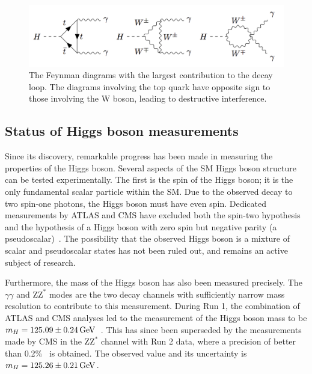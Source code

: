\begin{figure}[hptb]
  \centering
  \includegraphics[width=\textwidth]{Figures/Theory/FeynDecay.png}
  \caption[Feynman diagrams contributing to the \Hgg decay loop.]
  {
    The Feynman diagrams with the largest contribution to the \Hgg decay loop.
    The diagrams involving the top quark have opposite sign to those involving the W boson, 
    leading to destructive interference.
  }
  \label{fig:theory_FeynDecay}
\end{figure}

\subsection{Status of Higgs boson measurements}

Since its discovery, remarkable progress has been made 
in measuring the properties of the Higgs boson.
Several aspects of the SM Higgs boson structure can be tested experimentally.
The first is the spin of the Higgs boson; it is the only fundamental scalar particle within the SM.
Due to the observed decay to two spin-one photons, the Higgs boson must have even spin.
Dedicated measurements by ATLAS and CMS have excluded both the spin-two hypothesis 
and the hypothesis of a Higgs boson with zero spin
but negative parity (a pseudoscalar)~\cite{ATLASspinHiggs,CMSspinHiggs}. %
The possibility that the observed Higgs boson is a mixture of scalar 
and pseudoscalar states has not been ruled out, and remains an active subject of research.

Furthermore, the mass of the Higgs boson has also been measured precisely. 
The $\gamma\gamma$ and $\mathrm{ZZ}^{*}$ modes are the two decay channels with sufficiently narrow 
mass resolution to contribute to this measurement.
During Run 1, the combination of ATLAS and CMS analyses led to the measurement of the Higgs boson 
mass to be $m_{H} = 125.09 \pm \SI{0.24}{GeV}$~\cite{ATLASandCMSmass}.
This has since been superseded by the measurements made by CMS in the $\mathrm{ZZ}^{*}$ channel 
with Run 2 data, where a precision of better than 0.2\%~\cite{HIG-16-041} is obtained.
The observed value and its uncertainty is $m_{H} = 125.26 \pm \SI{0.21}{GeV}$.

